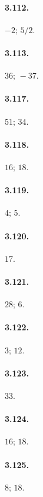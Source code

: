 \begin{multicols}{3}

\paragraph{3.112.}$ -2;\, 5/2 $.

\paragraph{3.113.}$ 36;\, -37 $.

\paragraph{3.117.}$ 51;\, 34 $.

\paragraph{3.118.}$16;\, 18$.

\paragraph{3.119.}$4;\, 5$.

\paragraph{3.120.}$17$.

\paragraph{3.121.}$ 28;\, 6 $.

\paragraph{3.122.}$3;\, 12$.

\paragraph{3.123.}$33$.

\paragraph{3.124.}$ 16;\, 18 $.

\paragraph{3.125.}$ 8;\, 18 $.


\end{multicols}
